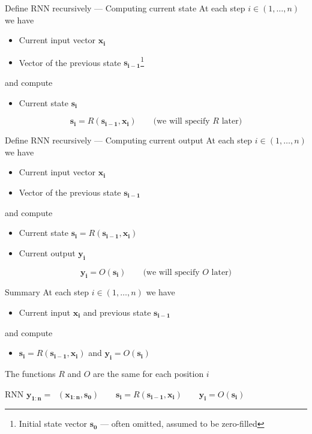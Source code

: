 \documentclass[12pt,aspectratio=169,handout]{beamer}
\DeclareMathOperator*{\rnnstar}{RNN^{*}}
\begin{document}
	
	
	\begin{frame}{Define RNN recursively --- Computing current state}
		At each step $i \in (1, \ldots, n)$ we have
		\begin{itemize}
			\item Current input vector $\bm{x_i}$
			\item Vector of the previous state $\bm{s_{i - 1}}$\footnote{Initial state vector $\bm{s_0}$ --- often omitted, assumed to be zero-filled}
		\end{itemize}
		and compute
		\begin{itemize}
			\item Current state $\bm{s_i}$
		\end{itemize}
		$$
		\bm{s_i} = R(\bm{s_{i-1}}, \bm{x_i}) \qquad \text{(we will specify $R$ later)}
		$$
		
	\end{frame}
	
	
	\begin{frame}{Define RNN recursively --- Computing current output}
		At each step $i \in (1, \ldots, n)$ we have
		\begin{itemize}
			\item Current input vector $\bm{x_i}$
			\item Vector of the previous state $\bm{s_{i - 1}}$
		\end{itemize}
		and compute
		\begin{itemize}
			\item Current state $\bm{s_i} = R(\bm{s_{i-1}}, \bm{x_i})$
			\item Current output $\bm{y_i}$
		\end{itemize}
		$$
		\bm{y_i} = O(\bm{s_i}) \qquad \text{(we will specify $O$ later)}
		$$
		
	\end{frame}
	
	
	\begin{frame}{Summary}
		At each step $i \in (1, \ldots, n)$ we have
		\begin{itemize}
			\item Current input $\bm{x_i}$ and previous state $\bm{s_{i - 1}}$
		\end{itemize}
		and compute
		\begin{itemize}
			\item $\bm{s_i} = R(\bm{s_{i-1}}, \bm{x_i})$ and $\bm{y_i}  = O(\bm{s_i})$
		\end{itemize}
		
		The functions $R$ and $O$ are the same for each position $i$
		
		\begin{block}{RNN}
			$\bm{y_{1:n}} = \rnnstar (\bm{x_{1:n}}, \bm{s_0})
			\qquad
			\bm{s_i} = R(\bm{s_{i-1}}, \bm{x_i})
			\qquad
			\bm{y_i}  = O(\bm{s_i})$
		\end{block}
		
		
	\end{frame}
	
\end{document}
